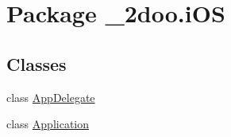 \hypertarget{namespace__2doo_1_1i_o_s}{
\section{Package \_\-2doo.iOS}
\label{namespace__2doo_1_1i_o_s}
}
\subsection*{Classes}
\begin{CompactItemize}
\item 
class \hyperlink{class__2doo_1_1i_o_s_1_1_app_delegate}{AppDelegate}
\item 
class \hyperlink{class__2doo_1_1i_o_s_1_1_application}{Application}
\end{CompactItemize}

